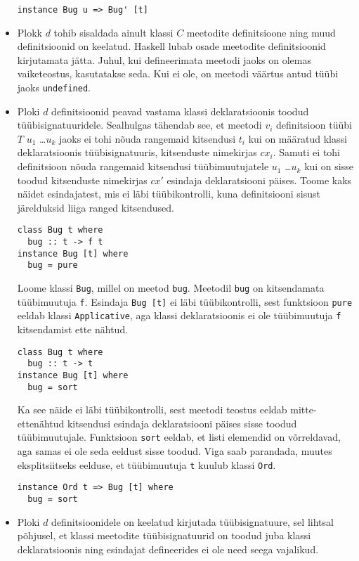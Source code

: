 \documentclass[12pt]{article}
\begin{document}
\begin{itemize}
            \begin{verbatim}instance Bug u => Bug' [t]\end{verbatim}
          \item
            Plokk $d$ tohib sisaldada ainult klassi $C$ meetodite definitsioone ning muud definitsioonid on keelatud. Haskell lubab osade meetodite definitsioonid kirjutamata jätta. Juhul, kui defineerimata meetodi jaoks on olemas vaiketeostus, kasutatakse seda. Kui ei ole, on meetodi väärtus antud tüübi jaoks \verb!undefined!. 
          \item
            Ploki $d$ definitsioonid peavad vastama klassi deklaratsioonis toodud tüübisignatuuridele. Sealhulgas tähendab see, et meetodi $v_i$ definitsioon tüübi $T$ $u_1$ \ldots $u_k$ jaoks ei tohi nõuda rangemaid kitsendusi $t_i$ kui on määratud klassi deklaratsioonis tüübisignatuuris, kitsenduste nimekirjas $cx_i$. Samuti ei tohi definitsioon nõuda rangemaid kitsendusi tüübimuutujatele $u_1$ \ldots $u_k$ kui on sisse toodud kitsenduste nimekirjas $cx'$ esindaja deklaratsiooni päises. Toome kaks näidet esindajatest, mis ei läbi tüübikontrolli, kuna definitsiooni sisust järelduksid liiga ranged kitsendused.

            \begin{verbatim}class Bug t where
  bug :: t -> f t
instance Bug [t] where
  bug = pure\end{verbatim}

            Loome klassi \verb!Bug!, millel on meetod \verb!bug!. Meetodil \verb!bug! on kitsendamata tüübimuutuja \verb!f!. Esindaja \verb!Bug [t]! ei läbi tüübikontrolli, sest funktsioon \verb!pure! eeldab klassi \verb!Applicative!, aga klassi deklaratsioonis ei ole tüübimuutuja \verb!f! kitsendamist ette nähtud.

            \begin{verbatim}class Bug t where
  bug :: t -> t
instance Bug [t] where
  bug = sort\end{verbatim}

            Ka see näide ei läbi tüübikontrolli, sest meetodi teostus eeldab mitte-ettenähtud kitsendusi esindaja deklaratsiooni päises sisse toodud tüübimuutujale. Funktsioon \verb!sort! eeldab, et listi elemendid on võrreldavad, aga samas ei ole seda eeldust sisse toodud. Viga saab parandada, muutes eksplitsiitseks eelduse, et tüübimuutuja \verb!t! kuulub klassi \verb!Ord!.

            \begin{verbatim}instance Ord t => Bug [t] where
  bug = sort\end{verbatim}
          \item
            Ploki $d$ definitsioonidele on keelatud kirjutada tüübisignatuure, sel lihtsal põhjusel, et klassi meetodite tüübisignatuurid on toodud juba klassi deklaratsioonis ning esindajat defineerides ei ole need seega vajalikud.
        \end{itemize}
\end{document}
